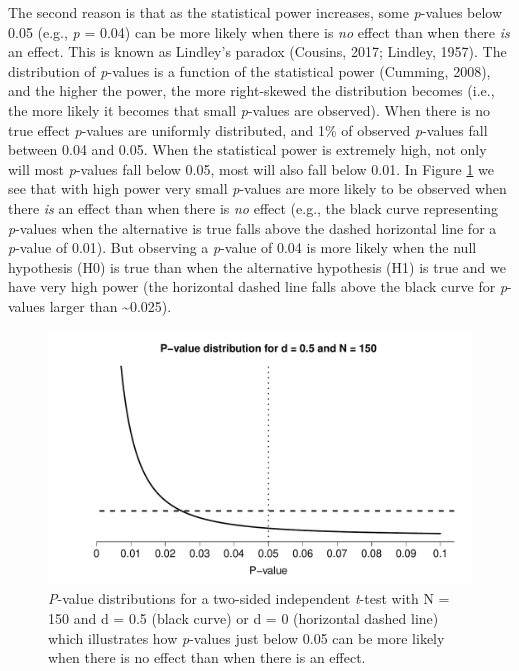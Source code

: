 \documentclass[
  english,
  ,man, a4paper,floatsintext]{apa6}
\begin{document}
The second reason is that as the statistical power increases, some \emph{p}-values below 0.05 (e.g., \emph{p} = 0.04) can be more likely when there is \emph{no} effect than when there \emph{is} an effect. This is known as Lindley's paradox (Cousins, 2017; Lindley, 1957). The distribution of \emph{p}-values is a function of the statistical power (Cumming, 2008), and the higher the power, the more right-skewed the distribution becomes (i.e., the more likely it becomes that small \emph{p}-values are observed). When there is no true effect \emph{p}-values are uniformly distributed, and 1\% of observed \emph{p}-values fall between 0.04 and 0.05. When the statistical power is extremely high, not only will most \emph{p}-values fall below 0.05, most will also fall below 0.01. In Figure \ref{fig:p-plot} we see that with high power very small \emph{p}-values are more likely to be observed when there \emph{is} an effect than when there is \emph{no} effect (e.g., the black curve representing \emph{p}-values when the alternative is true falls above the dashed horizontal line for a \emph{p}-value of 0.01). But observing a \emph{p}-value of 0.04 is more likely when the null hypothesis (H0) is true than when the alternative hypothesis (H1) is true and we have very high power (the horizontal dashed line falls above the black curve for \emph{p}-values larger than \textasciitilde0.025).

\begin{figure}
\centering
\includegraphics{Justify_in_Practice_files/figure-latex/p-plot-1.pdf}
\caption{\label{fig:p-plot}\emph{P}-value distributions for a two-sided independent \emph{t}-test with N = 150 and d = 0.5 (black curve) or d = 0 (horizontal dashed line) which illustrates how \emph{p}-values just below 0.05 can be more likely when there is no effect than when there is an effect.}
\end{figure}
\end{document}
